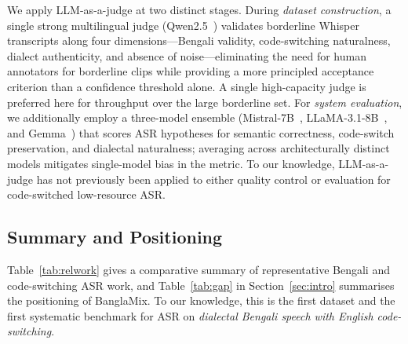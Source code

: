 We apply LLM-as-a-judge at two distinct stages. During \emph{dataset
construction}, a single strong multilingual judge (Qwen2.5~\citep{qwen2025})
validates borderline Whisper transcripts along four dimensions---Bengali
validity, code-switching naturalness, dialect authenticity, and absence of
noise---eliminating the need for human annotators for borderline clips while
providing a more principled acceptance criterion than a confidence threshold
alone. A single high-capacity judge is preferred here for throughput over the
large borderline set. For \emph{system evaluation}, we additionally employ a
three-model ensemble (Mistral-7B~\citep{jiang2023mistral},
LLaMA-3.1-8B~\citep{dubey2024llama}, and Gemma~\citep{team2024gemma}) that
scores ASR hypotheses for semantic correctness, code-switch preservation, and
dialectal naturalness; averaging across architecturally distinct models
mitigates single-model bias in the metric. To our knowledge, LLM-as-a-judge
has not previously been applied to either quality control or evaluation for
code-switched low-resource ASR.

\subsection{Summary and Positioning}

Table~\ref{tab:relwork} gives a comparative summary of representative Bengali
and code-switching ASR work, and Table~\ref{tab:gap} in
Section~\ref{sec:intro} summarises the positioning of BanglaMix.
To our knowledge, this is the first dataset and the first systematic benchmark
for ASR on \emph{dialectal Bengali speech with English code-switching}.

